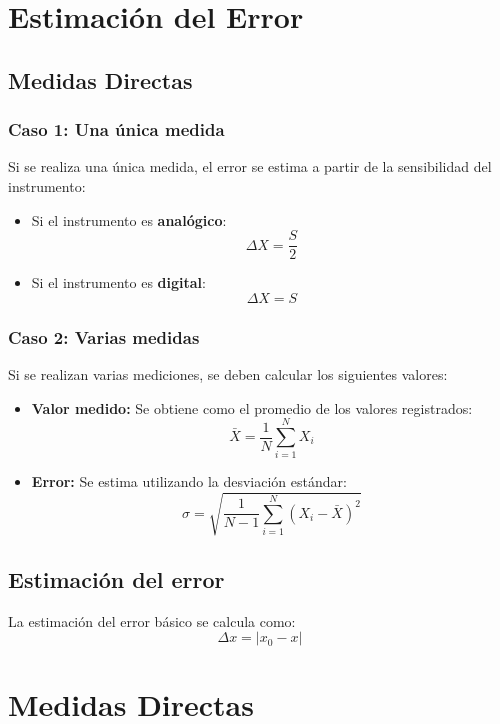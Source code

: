 \newpage
\section{Estimación del Error}
\subsection{Medidas Directas}

\subsubsection{Caso 1: Una única medida}

Si se realiza una única medida, el error se estima a partir de la sensibilidad del instrumento:

\begin{itemize}
    \item Si el instrumento es \textbf{analógico}: 
    \[
    \Delta X = \frac{S}{2}
    \]
    \item Si el instrumento es \textbf{digital}: 
    \[
    \Delta X = S
    \]
\end{itemize}

\subsubsection{Caso 2: Varias medidas}

Si se realizan varias mediciones, se deben calcular los siguientes valores:

\begin{itemize}
    \item \textbf{Valor medido:} Se obtiene como el promedio de los valores registrados:
    \[
    \bar{X} = \frac{1}{N} \sum_{i=1}^{N} X_i
    \]
    \item \textbf{Error:} Se estima utilizando la desviación estándar:
    \[
    \sigma = \sqrt{\frac{1}{N-1} \sum_{i=1}^{N} (X_i - \bar{X})^2}
    \]
\end{itemize}

\subsection{Estimación del error}
La estimación del error básico se calcula como:
\[
\Delta x = |x_0 - x|
\]

\newpage
\section{Medidas Directas}

